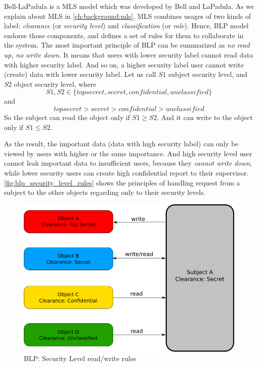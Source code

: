 Bell-LaPadula is a MLS model which was developed by Bell and LaPadula.
As we explain about MLS in \autoref{ch:background:mls}, MLS combines usages of two kinds of label: \emph{clearance} (or \emph{security level}) and \emph{classification} (or \emph{role}).
Hence, BLP model endorse those components, and defines a set of rules for them to collaborate in the system.
The most important principle of BLP can be summarized as \emph{no read up, no write down}.
It means that users with lower security label cannot read data with higher security label.
And so on, a higher security label user cannot write (create) data with lower security label.
Let us call $S1$ subject security level, and $S2$ object security level, where 
$$S1,S2 \in \{top secret, secret, confidential, unclassified\}$$ 
and 
$$top secret > secret > confidential > unclassified$$
So the subject can read the object only if $S1 \geq S2$.
And it can write to the object only if $S1 \leq S2$.

As the result, the important data (data with high security label) can only be viewed by users with higher or the same importance.
And high security level user cannot leak important data to insufficient users, because they \emph{cannot write down}, while lower security users can create high confidential report to their supervisor. 
\autoref{fig:blp_security_level_rules} shows the principles of handling request from a subject to the other objects regarding only to their security levels.

\begin{figure}[bth]
\myfloatalign
\includegraphics[width=1.0\linewidth]{gfx/chapter_2/blp_security_level_rules}
\caption[BLP: Security Level rules]{BLP: Security Level read/write rules}
\label{fig:blp_security_level_rules}
\end{figure}

